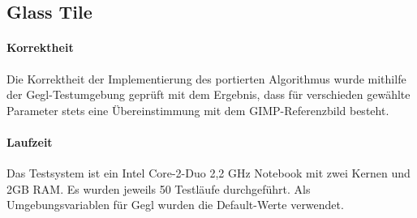 \subsection{Glass Tile}
\paragraph{Korrektheit}
Die Korrektheit der Implementierung des portierten Algorithmus wurde mithilfe der Gegl-Testumgebung geprüft mit dem Ergebnis, dass für verschieden gewählte Parameter stets eine Übereinstimmung mit dem GIMP-Referenzbild besteht.

\paragraph{Laufzeit}
Das Testsystem ist ein Intel Core-2-Duo 2,2 GHz Notebook mit zwei Kernen und 2GB RAM. Es wurden jeweils 50 Testläufe durchgeführt. Als Umgebungsvariablen für Gegl wurden die Default-Werte verwendet.

